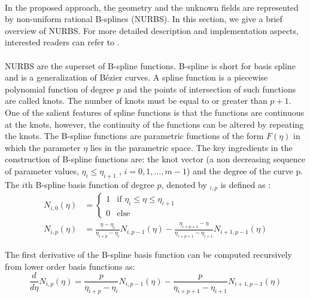 
\paragraph{}
In the proposed approach, the geometry and the unknown fields are represented by non-uniform rational B-splines (NURBS).
In this section, we give a brief overview of NURBS.
For more detailed description and implementation aspects, interested readers can refer to \cite{Pie1997,NGUYEN201589}.
\paragraph{}
NURBS are the superset of B-spline functions.
B-spline is short for basis spline and is a generalization of Bézier curves.
A spline function is a piecewise polynomial function of degree $p$ and the points of intersection of such functions are called knots.
The number of knots must be equal to or greater than $p + 1$.
One of the salient features of spline functions is that the functions are continuous at the knots, however, the continuity of the functions can be altered by repeating the knots.
The B-spline functions are parametric functions of the form $F(\eta)$ in which the parameter $\eta$ lies in the parametric space.
The key ingredients in the construction of B-spline functions are: the knot vector (a non decreasing sequence of parameter values, $\eta_i \leq \eta_{i+1}$ , $i = 0,1,\dots,m -1$) and the degree of the curve p. The $i$th B-spline basis function of degree $p$, denoted by $_{i,p}$ is defined as \cite{Pie1997}:
\begin{equation}
    \begin{aligned}
        N_{i,0}(\eta) &=
            \begin{cases}
                1   & \text{if } \eta_i \leq \eta \leq \eta_{i+1}    \\
                0   & \text{else}
            \end{cases}\\
        N_{i,p}(\eta) &= 
            \frac{\eta - \eta_i}{\eta_{i+p}-\eta_i}     N_{i,p-1}(\eta) - 
            \frac{\eta_{i+p+1}-\eta}{\eta_{i+p+1} - \eta_{i+1}}     N_{i+1,p-1}(\eta)
    \end{aligned}
    \label{lr_nurbs_basis}
\end{equation}

The first derivative of the B-spline basis function can be computed recursively from lower order basis functions as:
\begin{equation}
    \frac{d}{d\eta} N_{i,p}(\eta) =
        \frac{p}{\eta_{i+p} - \eta_i} N_{i,p-1}(\eta) -
        \frac{p}{\eta_{i+p+1} - \eta_{i+1}} N_{i+1,p-1}(\eta)
\end{equation}

